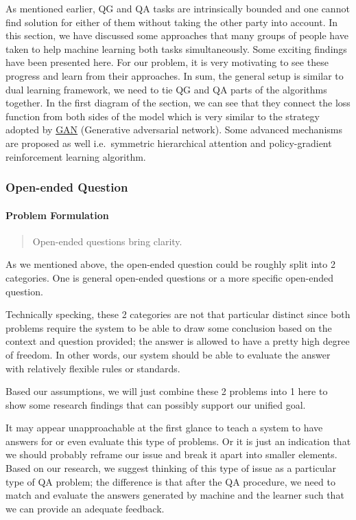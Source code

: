 \documentclass[]{book}
\let\oldparagraph\paragraph
\renewcommand{\paragraph}[1]{\oldparagraph{#1}\mbox{}}
\theoremstyle{definition}
\theoremstyle{definition}
\theoremstyle{definition}
\theoremstyle{remark}
\begin{document}
As mentioned earlier, QG and QA tasks are intrinsically bounded and one
cannot find solution for either of them without taking the other party
into account. In this section, we have discussed some approaches that
many groups of people have taken to help machine learning both tasks
simultaneously. Some exciting findings have been presented here. For our
problem, it is very motivating to see these progress and learn from
their approaches. In sum, the general setup is similar to dual learning
framework, we need to tie QG and QA parts of the algorithms together. In
the first diagram of the section, we can see that they connect the loss
function from both sides of the model which is very similar to the
strategy adopted by
\href{https://en.wikipedia.org/wiki/Generative_adversarial_network}{GAN}
(Generative adversarial network). Some advanced mechanisms are proposed
as well i.e.~symmetric hierarchical attention and policy-gradient
reinforcement learning algorithm.

\subsubsection{Open-ended Question}\label{open-ended-question}

\paragraph{Problem Formulation}\label{problem-formulation-1}

\begin{quote}
Open-ended questions bring clarity.
\end{quote}

As we mentioned above, the open-ended question could be roughly split
into 2 categories. One is general open-ended questions or a more
specific open-ended question.

Technically specking, these 2 categories are not that particular
distinct since both problems require the system to be able to draw some
conclusion based on the context and question provided; the answer is
allowed to have a pretty high degree of freedom. In other words, our
system should be able to evaluate the answer with relatively flexible
rules or standards.

Based our assumptions, we will just combine these 2 problems into 1 here
to show some research findings that can possibly support our unified
goal.

It may appear unapproachable at the first glance to teach a system to
have answers for or even evaluate this type of problems. Or it is just
an indication that we should probably reframe our issue and break it
apart into smaller elements. Based on our research, we suggest thinking
of this type of issue as a particular type of QA problem; the difference
is that after the QA procedure, we need to match and evaluate the
answers generated by machine and the learner such that we can provide an
adequate feedback.
\end{document}

